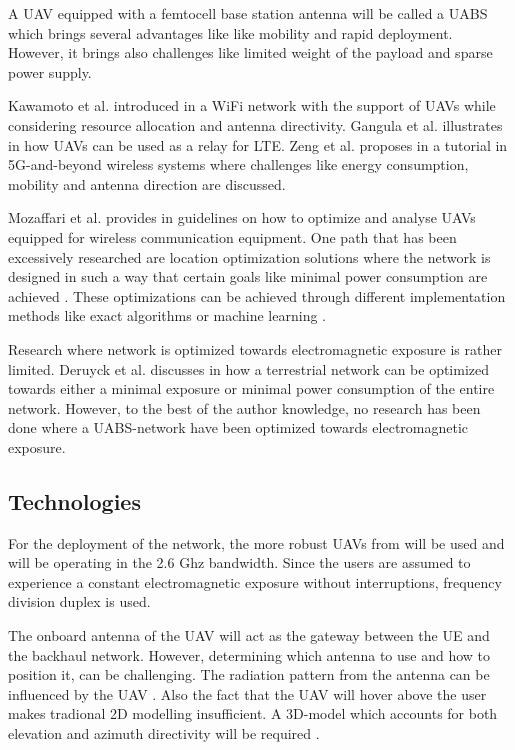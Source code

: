 \documentclass[twocolumn]{phdsymp} %
\begin{document}
A \gls{UAV} equipped with a femtocell base station antenna will be called a \gls{UABS}
which brings several advantages like like mobility and rapid deployment. 
However, it brings also challenges like limited weight of the payload and sparse power supply.

Kawamoto et al. introduced in \cite{U11} a WiFi network with the support of  \gls{UAV}s while considering resource allocation 
and antenna directivity. 
Gangula et al. illustrates in \cite{U10} how \gls{UAV}s can be  used as a relay for LTE. 
Zeng et al. proposes in  \cite{U12} a tutorial in 5G-and-beyond wireless systems where challenges like 
energy consumption, mobility and antenna direction are discussed. 

Mozaffari et al. provides in \cite{U3} guidelines on how to optimize and analyse \gls{UAV}s equipped for 
wireless communication equipment.
One path that has been excessively researched are location optimization solutions where the network is 
designed in such a way that certain goals like minimal power consumption are achieved \cite{U6,U7,U8,U9}.
These optimizations can be achieved through different implementation methods like exact algorithms or machine learning \cite{U3,U5}.

Research where network is optimized  towards electromagnetic exposure is rather limited.
Deruyck et al. discusses in \cite{J1} how a terrestrial network can be optimized towards either a minimal exposure or minimal power consumption of the entire network.
However, to the best of the author knowledge, no research has been done where a \gls{UABS}-network have been optimized towards electromagnetic exposure.

\subsection{Technologies}

For the deployment of the network, the more robust \gls{UAV}s from \cite{J2} will be used and will be operating in the 2.6 Ghz 
bandwidth. Since the users are assumed to experience a constant electromagnetic exposure without interruptions, frequency division duplex is used.

The onboard antenna of the \gls{UAV} will act as the gateway between the UE and the backhaul network.
However, determining which antenna to use and how to position it, can be challenging.
The radiation pattern from the antenna can be influenced by the \gls{UAV} \cite{A1}.
Also the fact that the \gls{UAV} will hover above the user makes tradional 2D modelling insufficient.
A 3D-model which accounts for both elevation and azimuth directivity 
will be required \cite{U12}.
\end{document}
